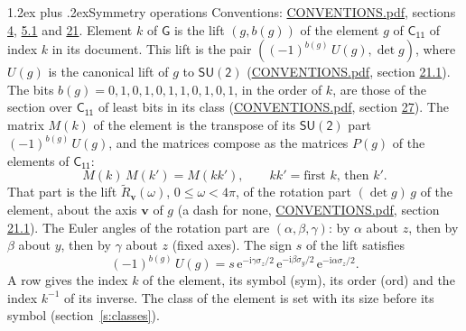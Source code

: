 \documentclass[10pt,a4paper]{article}
\makeatletter
\renewcommand\section{\@startsection{section}{1}{\z@}{-3ex plus -1ex minus -.2ex}%
  {1.2ex plus .2ex}{\normalfont\large\sffamily\bfseries\color{parttitle}}}
\numberwithin{equation}{section}
\newcommand{\grp}[1]{\mathsf{#1}}
\newcommand{\vv}{\mathbf{v}}
\newcommand{\iunit}{\mathrm{i}}
\newcommand{\expe}{\mathrm{e}}
\newcommand{\lift}[1]{\tilde{#1}}
\newcommand{\pauli}[1]{\sigma_{#1}}
\makeatother
\begin{document}
\section{Symmetry operations}\label{s:elements}
Conventions: \href{../../CONVENTIONS.pdf}{CONVENTIONS.pdf}, sections \href{../../../rotation/CONVENTIONS.pdf\#conv.4}{4}, \href{../../../rotation/CONVENTIONS.pdf\#conv.5.1}{5.1} and \href{../../CONVENTIONS.pdf\#conv.21}{21}.
\leavevmode\label{n:index.element}\label{n:element.g}\label{n:function.section}Element $k$ of $\grp{G}$ is the lift $(g, b(g))$ of the element $g$ of \href{../../../rotation/data/pdf/C11.pdf}{$\grp{C_{11}}$} of index $k$ in its document. This lift is the pair $((-1)^{b(g)}\,U(g), \det g)$, where $U(g)$ is the canonical lift of $g$ to $\grp{SU(2)}$ (\href{../../CONVENTIONS.pdf}{CONVENTIONS.pdf}, section \href{../../CONVENTIONS.pdf\#conv.21.1}{21.1}). The bits $b(g) = 0, 1, 0, 1, 0, 1, 1, 0, 1, 0, 1$, in the order of $k$, are those of the section over $\grp{C_{11}}$ of least bits in its class (\href{../../CONVENTIONS.pdf}{CONVENTIONS.pdf}, section \href{../../CONVENTIONS.pdf\#conv.27}{27}). \label{n:matrix.element.pin}\label{n:matrix.element}The matrix $M(k)$ of the element is the transpose of its $\grp{SU(2)}$ part $(-1)^{b(g)}\,U(g)$, and the matrices compose as the matrices $P(g)$ of the elements of $\grp{C_{11}}$:
\begin{equation}\label{e:mprod}M(k)\,M(k') = M(kk'),\qquad kk' = \text{first } k\text{, then } k'.\end{equation}
\leavevmode\label{n:angle.omega}\label{n:vector.axis}\label{n:vector.pole}That part is the lift $\lift{R}_{\vv}(\omega)$, $0 \le \omega < 4\pi$, of the rotation part $(\det g)\,g$ of the element, about the axis $\vv$ of $g$ (a dash for none, \href{../../CONVENTIONS.pdf}{CONVENTIONS.pdf}, section \href{../../CONVENTIONS.pdf\#conv.21.1}{21.1}). \label{n:angle.euler.alpha}\label{n:angle.euler.beta}\label{n:angle.euler.gamma}\label{n:vector.coordinates}The Euler angles of the rotation part are $(\alpha,\beta,\gamma)$: by $\alpha$ about $z$, then by $\beta$ about $y$, then by $\gamma$ about $z$ (fixed axes). \label{n:local.euler.sign}The sign $s$ of the lift satisfies
\begin{equation}\label{e:euler}(-1)^{b(g)}\,U(g) = s\,\expe^{-\iunit\gamma\pauli{z}/2}\,\expe^{-\iunit\beta\pauli{y}/2}\,\expe^{-\iunit\alpha\pauli{z}/2}.\end{equation}
\leavevmode\label{n:index.element.inverse}\label{n:head.sym}\label{n:head.ord}A row gives the index $k$ of the element, its symbol (sym), its order (ord) and the index $k^{-1}$ of its inverse. \label{n:head.class}The class of the element is set with its size before its symbol (section~\ref{s:classes}).
\end{document}
